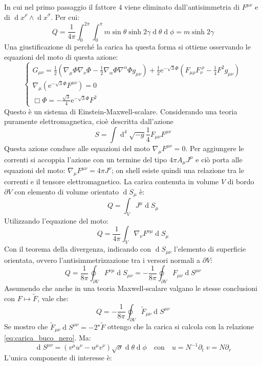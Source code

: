 \documentclass[]{scrartcl}
\newcommand{\me}{\mathrm{e}}
\newcommand{\pd}{\partial}
\newcommand{\sg}{\sqrt{-g}}
\renewcommand{\d}[1]{\ensuremath{\operatorname{d}\!{#1}}}
\newcommand{\dddd}[1]{\ensuremath{\operatorname{d}^4\!{#1}}}
\newcommand{\htF}{{}^\star \tilde{F}}
\begin{document}
%
In cui nel primo passaggio il fattore $ 4 $ viene eliminato dall'antisimmetria di $ F^{\mu\nu} $ e di $ \d x^\rho \wedge \d x^\sigma $.
Per cui:
\[
  Q = \frac{1}{4\pi} \int_0^{2\pi} \int_0^\pi m \sin\theta \sinh 2\gamma \d \theta \d \phi = m \sinh 2\gamma
\]
Una giustificazione di perché la carica ha questa forma si ottiene osservando le equazioni del moto di questa azione:
\[
  \begin{cases}
    G_{\mu\nu} = \frac{1}{2} \left( \nabla_\mu \Phi \nabla_\nu \Phi - \frac{1}{2} \nabla_\alpha \Phi \nabla^\alpha \Phi
      g_{\mu\nu}\right) + \frac{1}{2}\me^{-\sqrt{3}\Phi} \left( F_{\mu\rho} F_\nu^{\;\rho} - \frac{1}{4}F^2g_{\mu\nu} \right) \\
    \nabla_\mu \left( \me^{-\sqrt{3}\Phi} F^{\mu\nu} \right) = 0 \\
    \Box \Phi = - \frac{\sqrt{3}}{4}\me^{-\sqrt{3}\Phi} F^2
  \end{cases}
\]
Questo è un sistema di Einstein-Maxwell-scalare. Considerando una teoria puramente elettromagnetica, cioè descritta dall'azione
\[
  S = \int \dddd \sg \frac{1}{4}F_{\mu\nu}F^{\mu\nu}
\]
Questa azione conduce alle equazioni del moto $ \nabla_\mu F^{\mu\nu} = 0 $. Per aggiungere le correnti si accoppia l'azione con un termine
del tipo $ 4 \pi A_\mu J^\mu $ e ciò porta alle equazioni del moto: $ \nabla_\mu F^{\mu\nu} = 4 \pi J^\nu $; on shell esiste quindi una relazione
tra le correnti e il tensore elettromagnetico. La carica contenuta in volume $ V $ di bordo $ \pd V $ con elemento di volume orientato $ \d S_\mu $ è:
\[
  Q = \int_V J^\mu \d S_\mu
\]
Utilizzando l'equazione del moto:
\[
  Q = \frac{1}{4\pi}\int_V \nabla_\nu F^{\nu\mu} \d S_\mu
\]
Con il teorema della divergenza, indicando con $ \d S_{\mu\nu} $ l'elemento di superficie orientata, ovvero l'antisimmetrizzazione tra i versori
normali a $ \pd V $:
\[
  Q = \frac{1}{8\pi} \oint_{\pd V} F^{\nu\mu} \d S_{\mu\nu} =  - \frac{1}{8\pi} \oint_{\pd V} F_{\mu\nu} \d S^{\mu\nu}
\]
Assumendo che anche in una teoria Maxwell-scalare valgano le stesse conclusioni con $ F \mapsto \tilde{F} $, vale che:
\[
  Q = - \frac{1}{8\pi} \oint_{\pd V} \tilde{F}_{\mu\nu} \d S^{\mu\nu}
\]
Se mostro che $ \tilde{F}_{\mu\nu} \d S^{\mu\nu} = - 2 \htF $ ottengo che la carica si calcola con la relazione \eqref{eq:carica_buco_nero}.
Ma:
\[
  \d S^{\mu\nu} = \left( v^\mu u^\nu - u^\mu v^\nu \right) \sqrt{\sigma} \d \theta \d \phi \quad \text{con} \quad u = N^{-1}\pd_t \; v = N \pd_r
\]
L'unica componente di interesse è:
\end{document}
